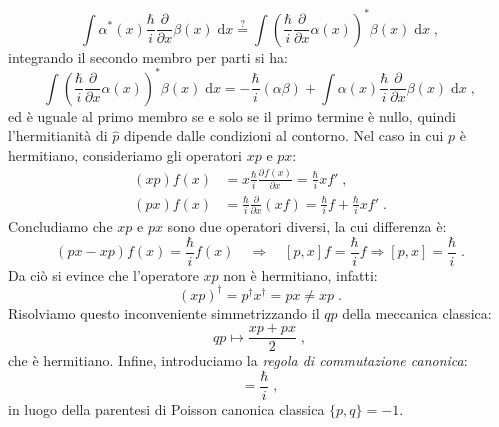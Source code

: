 \documentclass[12pt,a4paper]{report}
\theoremstyle{definition}
\newcommand{\pdev}[3][]{\frac{\partial^{#1} #2}{\partial #3^{#1}}}
\numberwithin{equation}{section}
\newcommand{\diff}[1][]{\mathrm{d}#1}
\begin{document}
$$
\int \alpha^*(x)\frac{\hbar}{i}\frac{\partial}{\partial x}\beta(x)\;\diff{x}\stackrel{?}{=}\int \left(\frac{\hbar}{i}\frac{\partial}{\partial x}\alpha(x)\right)^*\beta(x)\;\diff{x}\;,
$$
integrando il secondo membro per parti si ha:
$$
\int \left(\frac{\hbar}{i}\frac{\partial}{\partial x}\alpha(x)\right)^*\beta(x)\;\diff{x} =-\frac{\hbar}{i}(\alpha\beta)+\int \alpha(x)\frac{\hbar}{i}\frac{\partial}{\partial x}\beta(x)\;\diff{x}\;,
$$
ed è uguale al primo membro se e solo se il primo termine è nullo, quindi l'hermitianità di $\hat{p}$ dipende dalle condizioni al contorno. Nel caso in cui $p$ è hermitiano, consideriamo gli operatori $xp$ e $px$:
\begin{align*}
(xp)f(x)&=x\frac{\hbar}{i}\pdev{f(x)}{x}=\frac{\hbar}{i}xf'\;, \\
(px)f(x)&= \frac{\hbar}{i}\frac{\partial}{\partial x}(xf)=\frac{\hbar}{i}f+\frac{\hbar}{i}xf'\;.
\end{align*}
Concludiamo che $xp$ e $px$ sono due operatori diversi, la cui differenza è:
\begin{equation}
(px-xp)f(x)=\frac{\hbar}{i}f(x)\quad \Longrightarrow \quad [p,x]f=\frac{\hbar}{i}f \Longrightarrow [p,x]=\frac{\hbar}{i}\;.
\end{equation}
Da ciò si evince che l'operatore $xp$ non è hermitiano, infatti:
$$
(xp)^{\dagger}=p^{\dagger}x^{\dagger}=px\ne xp\;.
$$
Risolviamo questo inconveniente simmetrizzando il $qp$ della meccanica classica:
$$
qp \longmapsto \frac{xp+px}{2}\;,
$$
che è hermitiano. Infine, introduciamo la \textit{regola di commutazione canonica}:
\begin{equation}
[p,x]=\frac{\hbar}{i}\;,
\end{equation}
in luogo della parentesi di Poisson canonica classica $\{p,q\}=-1$.
\end{document}
